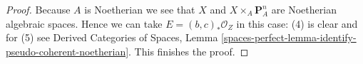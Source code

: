\documentclass[10pt,a4paper]{amsart}
\theoremstyle{plain}
\theoremstyle{definition}
\theoremstyle{remark}
\numberwithin{equation}{subsection}
\begin{document}
\begin{proof}
\medskip\noindent
Because $A$ is Noetherian we see that $X$ and $X \times_A \mathbf{P}^n_A$
are Noetherian algebraic spaces. Hence we can take $E = (b, c)_*\mathcal{O}_Z$
in this case: (4) is clear and for (5) see
Derived Categories of Spaces, Lemma
\ref{spaces-perfect-lemma-identify-pseudo-coherent-noetherian}.
This finishes the proof.
\end{proof}
\end{document}
